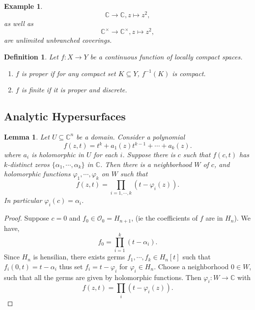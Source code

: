 \documentclass{article}
\newtheorem{definition}{Definition}[section]
\newtheorem{lemma}{Lemma}[section]
\newtheorem{example}{Example}[section]
\newcommand{\C}[0]{\mathbb{C}}
\begin{document}
\begin{example}
  \begin{equation*}
    \C\to\C, z\mapsto z^2,
  \end{equation*}
  as well as
  \begin{equation*}
    \C^\times\to\C^\times, z\mapsto z^2,
  \end{equation*}
  are unlimited unbranched coverings.
\end{example}

\begin{definition}
  Let $f:X\to Y$ be a continuous function of locally compact spaces. 
  \begin{enumerate}
    \item $f$ is proper if for any compact set $K\subseteq Y$, $f^{-1}(K)$ is compact.
    \item $f$ is finite if it is proper and discrete.
  \end{enumerate} 
\end{definition}

\subsection{Analytic Hypersurfaces}

\begin{lemma}
  Let $U\subseteq \C^n$ be a domain. Consider a polynomial 
  \begin{equation*}
    f(z,t) = t^k+a_1(z)t^{k-1}+\cdots+ a_k(z).
  \end{equation*}
  where $a_i$ is holomorphic in $U$ for each $i$. Suppose there is $c$ such that $f(c,t)$ has $k$-distinct zeros $\{\alpha_1,\cdots,\alpha_k\}$ in $\C$. Then there is a neighborhood $W$ of $c$, and holomorphic functions $\varphi_1,\cdots,\varphi_k$ on $W$ such that 
  \begin{equation*}
    f(z,t) = \prod_{i=1,\cdots,k}(t-\varphi_i(z)).
  \end{equation*}
  In particular $\varphi_i(c) = \alpha_i$.
\end{lemma}

\begin{proof}
  Suppose $c=0$ and $f_0\in\mathcal{O}_0=H_{n+1}$, (ie the coefficients of $f$ are in $H_n$). We have,
  \begin{equation*}
  f_0  = \prod_{i=1}^k (t-\alpha_i).
  \end{equation*}
  Since $H_n$ is hensilian, there exists germs $f_1,\cdots,f_k\in H_n[t]$ such that $f_i(0,t) = t-\alpha_{i}$ thus set $f_i = t-\varphi_i$ for $\varphi_i\in H_n$.
  Choose a neighborhood $0\in W$, such that all the germs are given by holomorphic functions. Then $\varphi_i:W\to\C$ with 
  \begin{equation*}
    f(z,t) = \prod_{i}(t-\varphi_i(z)).
  \end{equation*}
\end{proof}
\end{document}
